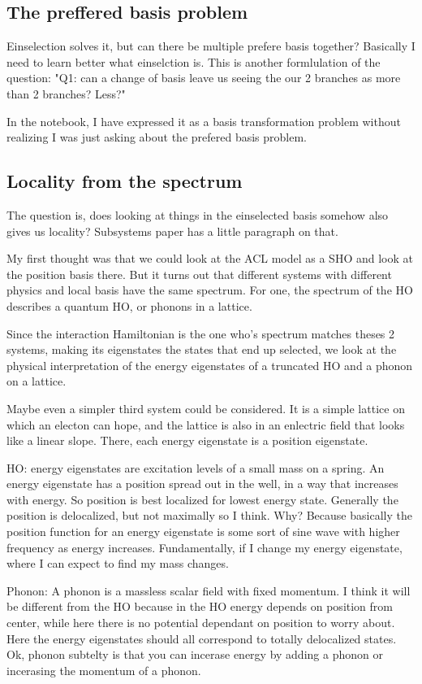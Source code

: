 \documentclass{article}
\begin{document}
\subsection{The preffered basis problem}
Einselection solves it, but can there be multiple prefere basis together? Basically I need to learn better what einselction is.
This is another formlulation of the question: "Q1: can a change of basis leave us seeing the our 2 branches as more than 2 branches? Less?"

In the notebook, I have expressed it as a basis transformation problem without realizing I was just asking about the prefered basis problem. 

\subsection{Locality from the spectrum}

The question is, does looking at things in the einselected basis somehow also gives us locality? 
Subsystems paper has a little paragraph on that.

My first thought was that we could look at the ACL model as a SHO and look at the position basis there. But it turns out that different systems with different physics and local basis have the same spectrum. For one, the spectrum of the HO describes a quantum HO, or phonons in a lattice. 

Since the interaction Hamiltonian is the one who's spectrum matches theses 2 systems, making its eigenstates the states that end up selected, we look at the physical interpretation of the energy eigenstates of a truncated HO and a phonon on a lattice.

Maybe even a simpler third system could be considered. It is a simple lattice on which an electon can hope, and the lattice is also in an enlectric field that looks like a linear slope. There, each energy eigenstate is a position eigenstate.

HO: energy eigenstates are excitation levels of a small mass on a spring. An energy eigenstate has a position spread out in the well, in a way that increases with energy. So position is best localized for lowest energy state. Generally the position is delocalized, but not maximally so I think. Why? Because basically the position function for an energy eigenstate is some sort of sine wave with higher frequency as energy increases. Fundamentally, if I change my energy eigenstate, where I can expect to find my mass changes.

Phonon: A phonon is a massless scalar field with fixed momentum. I think it will be different from the HO because in the HO energy depends on position from center, while here there is no potential dependant on position to worry about. Here the energy eigenstates should all correspond to totally delocalized states. 
Ok, phonon subtelty is that you can incerase energy by adding a phonon or incerasing the momentum of a phonon.
\end{document}
